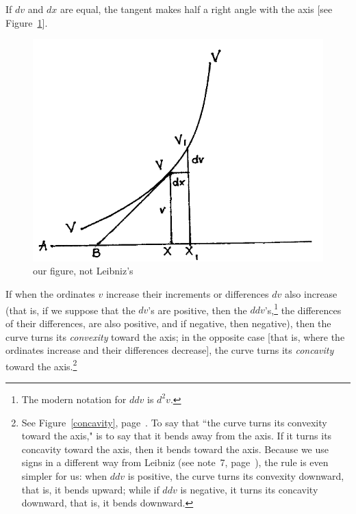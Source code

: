 \documentclass[twoside,openright]{article}
\begin{document}
If $dv$ and $dx$ are equal, the tangent makes half a right angle with
the axis [see Figure~\ref{45deg}].
\begin{figure}[htp]
  \begin{center}
    \includegraphics[width=.65\textwidth]{fig/Figure7}
    \caption{our figure, not Leibniz's}
    \label{45deg}
  \end{center}
\end{figure} If when the ordinates $v$ increase their increments or
differences $dv$ also increase (that is, if we suppose that the $dv$'s
are positive, then the $ddv$'s,\footnote{The modern notation for $ddv$
  is $d^2v$.}  the differences of their differences, are also
positive, and if negative, then negative), then the curve turns its
{\em convexity} toward the axis; in the opposite case [that is, where
the ordinates increase and their differences decrease], the curve
turns its {\em concavity} toward the axis.\footnote{See
  Figure~\ref{concavity}, page~\pageref{concavity}.  To say that ``the
  curve turns its convexity toward the axis," is to say that it bends
  away from the axis.  If it turns its concavity toward the
  axis, then it bends toward the axis.  Because we use signs in a
  different way from Leibniz (see note~7, page~\pageref{cnm7}), the
  rule is even simpler for us: when $ddv$ is positive, the curve turns
  its convexity downward, that is, it bends upward; while if $ddv$ is
  negative, it turns its concavity downward, that is, it bends
  downward.}
\end{document}
